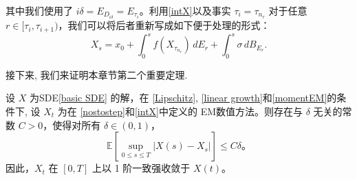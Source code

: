 其中我们使用了 \( i\delta = E_{D_{i\delta}} = E_{\tau_i} \)。利用\cref{intX}以及事实 \(\tau_i = \tau_{n_r}\) 对于任意 \( r \in [\tau_i, \tau_{i+1}) \)，我们可以将后者重新写成如下便于处理的形式：
\begin{equation}
	X_s = x_0 + \int_{0}^{s} f\left(X_{\tau_{n_r}}\right) \, dE_r + \int_{0}^{s} \sigma \, dB_{E_r}.
\end{equation}


接下来, 我们来证明本章节第二个重要定理. 
\begin{theorem}\label{main th EM1}
	设 $X$ 为SDE\textnormal{\cref{basic SDE} }的解，在 \textnormal{\cref{Lipschitz}}, \textnormal{\cref{linear growth}}和\textnormal{\cref{momentEM}}的条件下, 
	设 $X_t$ 为在 \textnormal{\cref{nostostep}}和\textnormal{\cref{intX}}中定义的 EM数值方法。则存在与 $\delta$ 无关的常数 $C > 0$，使得对所有 $\delta \in (0,1)$，
	\[
	\mathbb{E} \left[ \sup_{0 \leq s \leq T} | X(s) - X_s | \right] \leq C \delta。
	\]
	因此，$X_t$ 在 $[0, T]$ 上以 1 阶一致强收敛于 $X(t)$。
\end{theorem}

